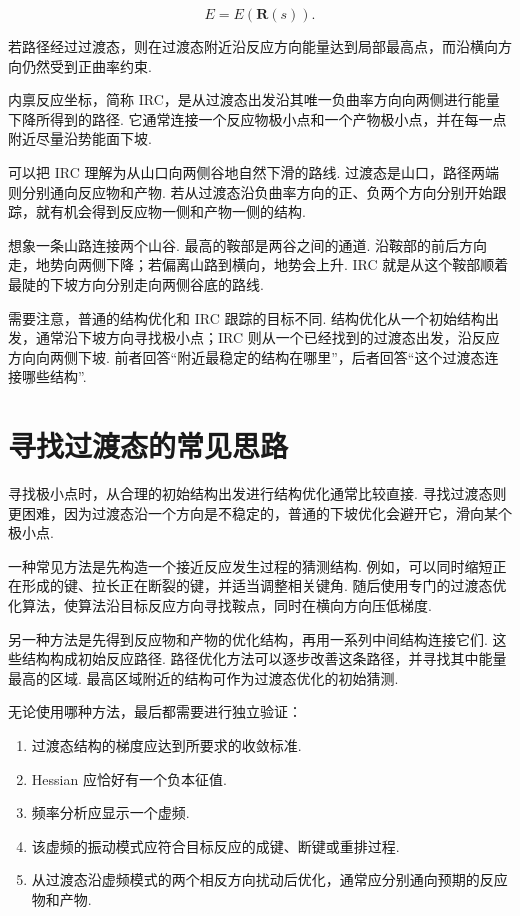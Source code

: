 \documentclass[UTF8,11pt,a4paper,openany]{ctexbook}
\begin{document}
\[
E=E(\mathbf R(s)).
\]

若路径经过过渡态，则在过渡态附近沿反应方向能量达到局部最高点，而沿横向方向仍然受到正曲率约束. 

\begin{definitionbox}
内禀反应坐标，简称 IRC，是从过渡态出发沿其唯一负曲率方向向两侧进行能量下降所得到的路径. 它通常连接一个反应物极小点和一个产物极小点，并在每一点附近尽量沿势能面下坡. 
\end{definitionbox}

可以把 IRC 理解为从山口向两侧谷地自然下滑的路线. 过渡态是山口，路径两端则分别通向反应物和产物. 若从过渡态沿负曲率方向的正、负两个方向分别开始跟踪，就有机会得到反应物一侧和产物一侧的结构. 

\begin{analogybox}
想象一条山路连接两个山谷. 最高的鞍部是两谷之间的通道. 沿鞍部的前后方向走，地势向两侧下降；若偏离山路到横向，地势会上升. IRC 就是从这个鞍部顺着最陡的下坡方向分别走向两侧谷底的路线. 
\end{analogybox}

需要注意，普通的结构优化和 IRC 跟踪的目标不同. 结构优化从一个初始结构出发，通常沿下坡方向寻找极小点；IRC 则从一个已经找到的过渡态出发，沿反应方向向两侧下坡. 前者回答“附近最稳定的结构在哪里”，后者回答“这个过渡态连接哪些结构”. 

\section{寻找过渡态的常见思路}

寻找极小点时，从合理的初始结构出发进行结构优化通常比较直接. 寻找过渡态则更困难，因为过渡态沿一个方向是不稳定的，普通的下坡优化会避开它，滑向某个极小点. 

一种常见方法是先构造一个接近反应发生过程的猜测结构. 例如，可以同时缩短正在形成的键、拉长正在断裂的键，并适当调整相关键角. 随后使用专门的过渡态优化算法，使算法沿目标反应方向寻找鞍点，同时在横向方向压低梯度. 

另一种方法是先得到反应物和产物的优化结构，再用一系列中间结构连接它们. 这些结构构成初始反应路径. 路径优化方法可以逐步改善这条路径，并寻找其中能量最高的区域. 最高区域附近的结构可作为过渡态优化的初始猜测. 

无论使用哪种方法，最后都需要进行独立验证：

\begin{enumerate}
\item 过渡态结构的梯度应达到所要求的收敛标准. 
\item Hessian 应恰好有一个负本征值. 
\item 频率分析应显示一个虚频. 
\item 该虚频的振动模式应符合目标反应的成键、断键或重排过程. 
\item 从过渡态沿虚频模式的两个相反方向扰动后优化，通常应分别通向预期的反应物和产物. 
\end{enumerate}
\end{document}
